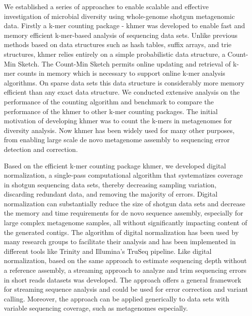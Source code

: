 We established a series of approaches to enable scalable
and effective investigation of microbial diversity using whole-genome shotgun
metagenomic data.  Firstly a k-mer counting package - khmer was developed to
enable fast and memory efficient k-mer-based analysis of sequencing data sets.
Unlike previous methods based on data structures such as hash tables, suffix
arrays, and trie structures, khmer relies 
 entirely on a simple probabilistic data structure, a Count-Min Sketch. The
 Count-Min Sketch permits online updating and retrieval of k-mer counts in
 memory which is necessary to support online k-mer analysis algorithms. On
 sparse data sets this data structure is considerably more  memory efficient
 than any exact data structure.
  We conducted extensive  analysis on the performance of the counting algorithm
  and benchmark to compare the performance of the khmer to other k-mer counting
  packages. 
   The initial motivation of developing khmer was to count the  k-mers in
   metagenomes for diversity analysis. Now khmer has been widely used for many
   other purposes, from  
      enabling large scale de novo metagenome assembly  to sequencing error
      detection and correction.
        
         Based on the efficient k-mer counting package khmer, we developed
         digital normalization, a single-pass  computational algorithm that
         systematizes coverage in shotgun sequencing data sets, thereby
         decreasing sampling  variation, discarding redundant data, and
         removing the majority of errors. Digital normalization can
         substantially reduce the size of shotgun data sets and decrease the
         memory and time requirements for de novo sequence assembly, especially
         for large complex metagenome samples, all without significantly
             impacting content of the generated contigs.  The algorithm of
             digital normalization has been used by many research groups to
             facilitate their analysis and has been implemented in different
             tools like Trinity and  Illumina's TruSeq pipeline. Like digital
             normalization, based on the same approach to estimate sequencing
             depth without a reference assembly, a streaming approach to
             analyze and trim sequencing errors in short reads datasets was
             developed. The approach offers a general framework for streaming
             sequence analysis and could be used for error correction and
             variant calling. Moreover, the approach can be applied generically
             to data sets with variable sequencing coverage, such as
             metagenomes especially.

